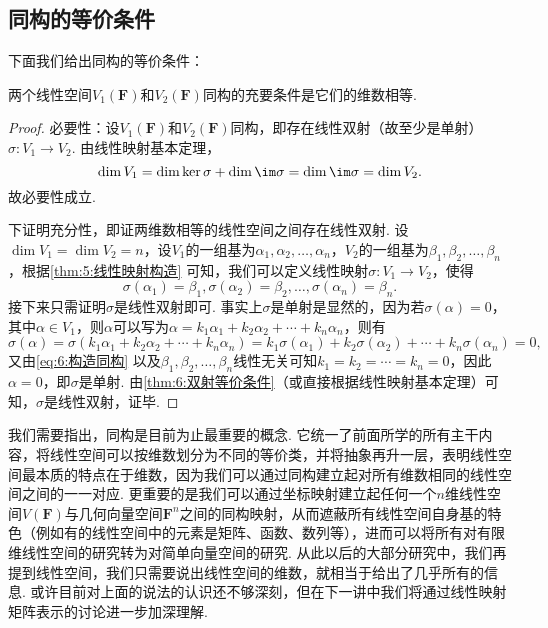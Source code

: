 \subsection{同构的等价条件}

下面我们给出同构的等价条件：
\begin{theorem}\label{thm:6:同构的等价条件}
    两个线性空间$V_1(\mathbf{F})$和$V_2(\mathbf{F})$同构的充要条件是它们的维数相等.
\end{theorem}

\begin{proof}
    必要性：设$V_1(\mathbf{F})$和$V_2(\mathbf{F})$同构，即存在线性双射（故至少是单射）$\sigma:V_1\to V_2$. 由线性映射基本定理，
    \[\dim V_1=\dim\ker\sigma+\dim\im\sigma=\dim\im\sigma=\dim V_2.\]
    故必要性成立.

    下证明充分性，即证两维数相等的线性空间之间存在线性双射. 设$\dim V_1=\dim V_2=n$，设$V_1$的一组基为$\alpha_1,\alpha_2,\ldots,\alpha_n$，$V_2$的一组基为$\beta_1,\beta_2,\ldots,\beta_n$，根据\autoref{thm:5:线性映射构造} 可知，我们可以定义线性映射$\sigma:V_1\to V_2$，使得
    \begin{equation}\label{eq:6:构造同构}
        \sigma(\alpha_1)=\beta_1,\sigma(\alpha_2)=\beta_2,\ldots,\sigma(\alpha_n)=\beta_n.
    \end{equation}
    接下来只需证明$\sigma$是线性双射即可. 事实上$\sigma$是单射是显然的，因为若$\sigma(\alpha)=0$，其中$\alpha\in V_1$，则$\alpha$可以写为$\alpha=k_1\alpha_1+k_2\alpha_2+\cdots+k_n\alpha_n$，则有
    \[\sigma(\alpha)=\sigma(k_1\alpha_1+k_2\alpha_2+\cdots+k_n\alpha_n)=k_1\sigma(\alpha_1)+k_2\sigma(\alpha_2)+\cdots+k_n\sigma(\alpha_n)=0,\]
    又由\autoref{eq:6:构造同构} 以及$\beta_1,\beta_2,\ldots,\beta_n$线性无关可知$k_1=k_2=\cdots=k_n=0$，因此$\alpha=0$，即$\sigma$是单射. 由\autoref{thm:6:双射等价条件}（或直接根据线性映射基本定理）可知，$\sigma$是线性双射，证毕.
\end{proof}

我们需要指出，同构是目前为止最重要的概念. 它统一了前面所学的所有主干内容，将线性空间可以按维数划分为不同的等价类，并将抽象再升一层，表明线性空间最本质的特点在于维数，因为我们可以通过同构建立起对所有维数相同的线性空间之间的一一对应. 更重要的是我们可以通过坐标映射建立起任何一个$n$维线性空间$V(\mathbf{F})$与几何向量空间$\mathbf{F}^n$之间的同构映射，从而遮蔽所有线性空间自身基的特色（例如有的线性空间中的元素是矩阵、函数、数列等），进而可以将所有对有限维线性空间的研究转为对简单向量空间的研究. 从此以后的大部分研究中，我们再提到线性空间，我们只需要说出线性空间的维数，就相当于给出了几乎所有的信息. 或许目前对上面的说法的认识还不够深刻，但在下一讲中我们将通过线性映射矩阵表示的讨论进一步加深理解.

